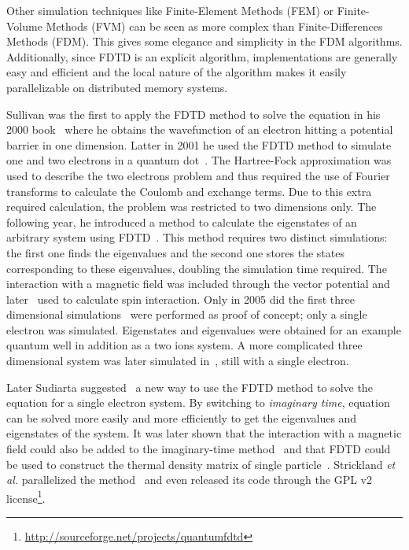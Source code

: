 Other simulation techniques like Finite-Element Methods (FEM) or Finite-Volume
Methods (FVM) can be seen as more complex than Finite-Differences Methods
(FDM). This gives some elegance and simplicity in the FDM algorithms.
Additionally, since FDTD is an explicit algorithm, implementations are
generally easy and efficient and the local nature of the algorithm makes it
easily parallelizable on distributed memory systems.

Sullivan was the first to apply the FDTD method to solve the \schrodinger
equation in his 2000 book~\cite{Sullivan2000} where he obtains the wavefunction
of an electron hitting a potential barrier in one dimension.
Latter in 2001 he used the FDTD
method to simulate one and two electrons in a quantum dot~\cite{Sullivan2001}.
The Hartree-Fock approximation was used to describe the two electrons problem
and thus required the use of Fourier transforms to calculate the Coulomb
and exchange terms. Due to this extra required calculation, the problem was
restricted to two dimensions only. The following year, he introduced a method
to calculate the eigenstates of an arbitrary system using
FDTD~\cite{Sullivan2002}. This method requires two distinct simulations: the
first one finds the eigenvalues and the second one stores the states
corresponding to these eigenvalues, doubling the simulation time required.
The interaction with a magnetic field was included through the vector potential
and later~\cite{Sullivan2003,Sullivan2004} used to calculate spin interaction.
Only in 2005 did the first three dimensional
simulations~\cite{Sullivan2005a} were performed as proof of concept; only a
single electron was simulated. Eigenstates and eigenvalues were obtained for an
example quantum well in addition as a two ions system. A more complicated three
dimensional system was later simulated in~\cite{Sullivan2005b}, still with a
single electron.

Later Sudiarta suggested~\cite{Sudiarta2007} a new way to use the FDTD method to
solve the \schrodinger equation for a single electron system. By switching to
\textit{imaginary time}, \schrodinger equation can be solved more easily and
more efficiently to get the eigenvalues and eigenstates of the system. It was
later shown that the interaction with a magnetic field could also be added to
the imaginary-time method~\cite{Sudiarta2008} and that FDTD could be used to
construct the thermal density matrix of single particle~\cite{Sudiarta2009}.
Strickland \textit{et al.} parallelized the method~\cite{Strickland2010} and
even released its code through the GPL v2
license\footnote{\url{http://sourceforge.net/projects/quantumfdtd}}.


